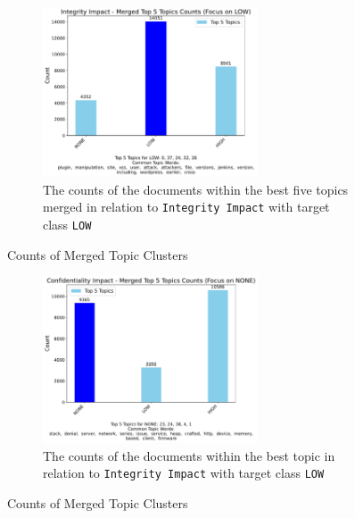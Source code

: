 \documentclass[12pt]{article}
\begin{document}
\begin{figure}[h!]
	\ContinuedFloat*
	\centering
	\begin{subfigure}{\textwidth}
		\centering
		\includegraphics[width=0.7\textwidth]{figures/integrityImpact/merged_top_k_topics_category_focus_counts_integrityImpact_LOW_k5.pdf}
		\caption{The counts of the documents within the best five topics merged in relation to \texttt{Integrity
				Impact} with
			target class \texttt{LOW}}

		\label{fig:integrityImpact_60_NONE_merged}
	\end{subfigure}
	\caption{Counts of Merged Topic Clusters}

\end{figure}

\begin{figure}[h!]
	\ContinuedFloat
	\centering
	\begin{subfigure}{\textwidth}
		\centering
		\includegraphics[width=0.7\textwidth]{figures/confidentialityImpact/merged_top_k_topics_category_focus_counts_confidentialityImpact_NONE_k5.pdf}
		\caption{The counts of the documents within the best topic in relation to \texttt{Integrity Impact} with target class \texttt{LOW}}
		\label{fig:confidentialityImpact_60_LOW_merged}
	\end{subfigure}

	\caption{Counts of Merged Topic Clusters}
\end{figure}
\end{document}
